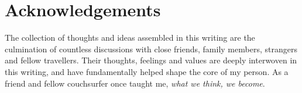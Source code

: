 \section*{Acknowledgements}

The collection of thoughts and ideas assembled in this writing are the culmination of countless discussions with close friends, family members, strangers and fellow travellers. Their thoughts, feelings and values are deeply interwoven in this writing, and have fundamentally helped shape the core of my person. As a friend and fellow couchsurfer once taught me, \textit{what we think, we become}.
